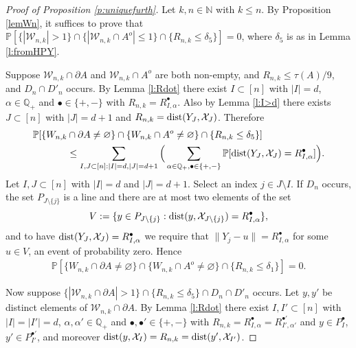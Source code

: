 \documentclass[12pt]{article}
\newcommand{\N}{\mathbb{N}}
\newcommand{\cX}{\mathcal{X}}
\newcommand{\cW}{\mathcal{W}}
\renewcommand{\Pr}{\mathbb{P}}
\newcommand{\X}{\mathcal{X}}
\renewcommand{\emptyset}{\varnothing}
\newcommand{\dist}{{\rm dist}}
\begin{document}
\begin{proof}[Proof of Proposition \ref{p:uniquefurth}]
	Let $k, n \in \N$ with $k \leq n$.
	By Proposition \ref{lemWn}, it suffices to prove that
	$\Pr[ \{ |\cW_{n,k}| > 1 \} 
	\cap \{ |\cW_{n,k} \cap A^o | \leq 1 \} 
	\cap \{R_{n,k} \leq \delta_5\}] = 0$, where
	$\delta_5$ is as in Lemma
	\ref{l:fromHPY}.

	  Suppose $\mathcal W_{n,k} \cap \partial A$ and 
	   $ \cW_{n,k} \cap A^o  $ are both non-empty,
	   and
	   $R_{n,k} \leq \tau(A)/9$, and $D_n \cap D'_n$ occurs.
	By Lemma \ref{l:Rdot} there exist $I \subset [n]$
	with $|I|=d$, $\alpha \in  \mathbb Q_+$
	and $\bullet \in \{+,-\}$ with
	$R_{n,k} =R^\bullet_{I,\alpha}$.
	Also  by Lemma \ref{l:I>d} there exists $J \subset [n]$
	with $|J|=d+1$ and $R_{n,k} = \dist(Y_J,\X_J)$. Therefore
	\begin{align*}
		\mathbb P[\{W_{n,k} & \cap \partial A \neq \emptyset\}
	\cap \{W_{n,k} \cap A^o \neq \emptyset \}
		\cap \{R_{n,k} \leq \delta_5\} ]
		\\
		& \leq \sum_{I,J\subset [n]: |I|= d,|J| =d +1}
		\Big(
		\sum_{\alpha \in \mathbb Q_+ , \bullet \in \{+,-\}}
		\Pr [
		\dist(Y_J,\X_J) 
			= 
			R_{I,\alpha}^\bullet 
		] \Big).
	\end{align*}
	Let $I,J \subset [n]$
	with $|I|= d$ and $|J|= d+1$. 
	Select an index
	$j \in J \setminus I$. 
	If $D_n$ occurs, the set $P_{J \setminus \{j\}}$
	is a line and there are at most two elements 
	of the set
	$$
	V := \{y \in P_{J \setminus \{j\}}: \dist (y,\X_{J \setminus \{j\}}) 
	= R_{I,\alpha}^\bullet \},
	$$
	and to have 
		$
		\dist(Y_J,\X_J) 
		= 
		R_{I,\alpha}^\bullet 
		$
		we require that $\|Y_j-u\| = R_{I,\alpha}^\bullet$
		for some $u \in V$,
		 an event of probability zero.
		 Hence
		 \begin{align}
	\mathbb P[\{W_{n,k} \cap \partial A \neq \emptyset\}
	\cap \{W_{n,k} \cap A^o \neq \emptyset \}
		\cap \{R_{n,k} \leq \delta_1\} ]
			 =0.
			 \label{e:0726a}
		 \end{align}
	

Now suppose $\{|\cW_{n,k} \cap \partial A| > 1\} \cap
	\{R_{n,k} \leq \delta_5 \} \cap D_n \cap D'_n$
	occurs.  Let $y,y'$ be distinct elements of
$\cW_{n,k} \cap \partial A $. 
	By Lemma \ref{l:Rdot} there exist $I,I' \subset [n]$
	with $|I|= |I'|=d$, $\alpha, \alpha' \in  \mathbb Q_+$
	and $\bullet, \bullet' \in \{+,-\}$ with
	$R_{n,k} =R^\bullet_{I,\alpha} = R^{\bullet'}_{I',\alpha'}$ 
	and $y \in P^\bullet_{I}$, $y' \in P^{\bullet'}_{I'}$,
	and moreover $\dist(y,\cX_I) = R_{n,k}
	= \dist(y',\cX_{I'})$.


\end{proof}
\end{document}
